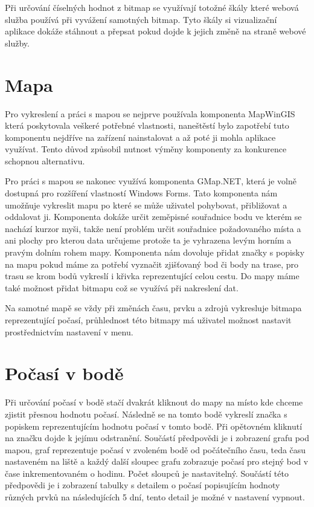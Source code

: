 \documentclass[czech,bachelor,dept460,male,csharp,cpdeclaration]{diploma}
\begin{document}
	Při určování číselných hodnot z bitmap se využívají totožné škály které webová služba používá při vyvážení samotných bitmap. Tyto škály si vizualizační aplikace dokáže stáhnout a přepsat pokud dojde k jejich změně na straně webové služby.
	
	\section{Mapa}
	
	Pro vykreslení a práci s mapou se nejprve používala komponenta MapWinGIS která poskytovala veškeré potřebné vlastnosti, naneštěstí bylo zapotřebí tuto komponentu nejdříve na zařízení nainstalovat a až poté ji mohla aplikace využívat. Tento důvod způsobil nutnost výměny komponenty za konkurence schopnou alternativu.
	
	Pro práci s mapou se nakonec využívá komponenta GMap.NET, která je volně dostupná pro rozšíření vlastností Windows Forms. Tato komponenta nám umožňuje vykreslit mapu po které se může uživatel pohybovat, přibližovat a oddalovat ji. Komponenta dokáže určit zeměpisné souřadnice bodu ve kterém se nachází kurzor myši, takže není problém určit souřadnice požadovaného místa a ani plochy pro kterou data určujeme protože ta je vyhrazena levým horním a pravým dolním rohem mapy. Komponenta nám dovoluje přidat značky s popisky na mapu pokud máme za potřebí vyznačit zjišťovaný bod či body na trase, pro trasu se krom bodů vykreslí i křivka reprezentující celou cestu. Do mapy máme také možnost přidat bitmapu což se využívá při nakreslení dat.
	
	Na samotné mapě se vždy při změnách času, prvku a zdrojů vykresluje bitmapa reprezentující počasí, průhlednost této bitmapy má uživatel možnost nastavit prostřednictvím nastavení v menu.
	
	\section{Počasí v bodě}
	
	Při určování počasí v bodě stačí dvakrát kliknout do mapy na místo kde chceme zjistit přesnou hodnotu počasí. Následně se na tomto bodě vykreslí značka s popiskem reprezentujícím hodnotu počasí v tomto bodě. Při opětovném kliknutí na značku dojde k jejímu odstranění. Součástí předpovědi je i zobrazení grafu pod mapou, graf reprezentuje počasí v zvoleném bodě od počátečního času, teda času nastaveném na liště a každý další sloupec grafu zobrazuje počasí pro stejný bod v čase inkrementovaném o hodinu. Počet sloupců je nastavitelný. Součástí této předpovědi je i zobrazení tabulky s detailem o počasí popisujícím hodnoty různých prvků na následujících 5 dní, tento detail je možné v nastavení vypnout.
	
\end{document}
